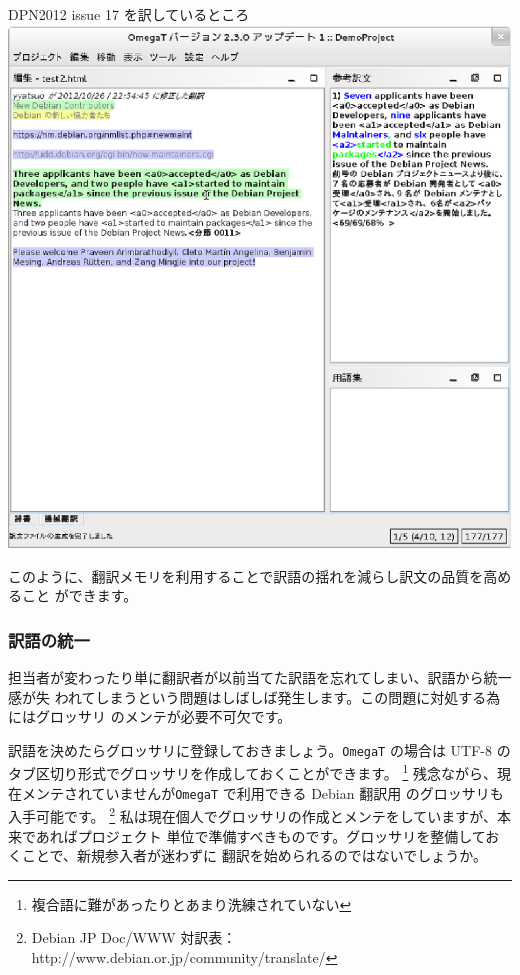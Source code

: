 \documentclass[mingoth,a4paper]{jsarticle}
\begin{document}
\begin{itembox}[l]{DPN2012 issue 17 を訳しているところ}
    \includegraphics{image201210/omegat_demo2.eps}
\end{itembox}

このように、翻訳メモリを利用することで訳語の揺れを減らし訳文の品質を高めること
ができます。

\subsubsection{訳語の統一}

担当者が変わったり単に翻訳者が以前当てた訳語を忘れてしまい、訳語から統一感が失
われてしまうという問題はしばしば発生します。この問題に対処する為にはグロッサリ
のメンテが必要不可欠です。

訳語を決めたらグロッサリに登録しておきましょう。{\tt OmegaT} の場合は UTF-8 の
タブ区切り形式でグロッサリを作成しておくことができます。
\footnote{複合語に難があったりとあまり洗練されていない}
残念ながら、現在メンテされていませんが{\tt OmegaT} で利用できる Debian 翻訳用
のグロッサリも入手可能です。
\footnote{Debian JP Doc/WWW 対訳表：http://www.debian.or.jp/community/translate/}
私は現在個人でグロッサリの作成とメンテをしていますが、本来であればプロジェクト
単位で準備すべきものです。グロッサリを整備しておくことで、新規参入者が迷わずに
翻訳を始められるのではないでしょうか。
\end{document}

